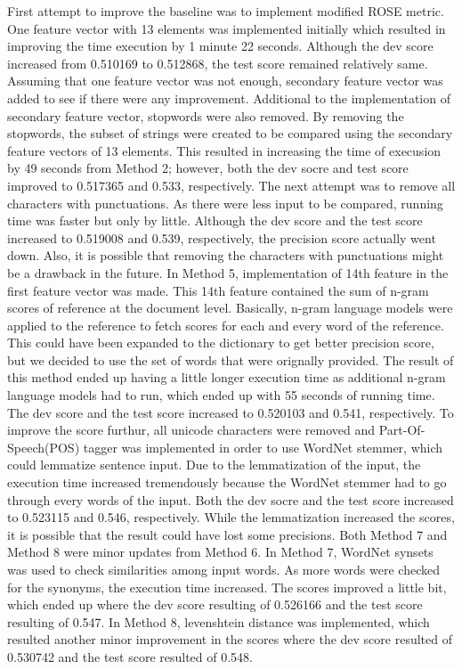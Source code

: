 \documentclass[11pt,letterpaper]{article}
\begin{document}
First attempt to improve the baseline was to implement modified ROSE metric. One feature vector with 13 elements was implemented initially which resulted in improving the time execution by 1 minute 22 seconds. Although the dev score increased from 0.510169 to 0.512868, the test score remained relatively same. Assuming that one feature vector was not enough, secondary feature vector was added to see if there were any improvement.
        Additional to the implementation of secondary feature vector, stopwords were also removed. By removing the stopwords, the subset of strings were created to be compared using the secondary feature vectors of 13 elements. This resulted in increasing the time of execusion by 49 seconds from Method 2; however, both the dev socre and test score improved to 0.517365 and 0.533, respectively.
        The next attempt was to remove all characters with punctuations. As there were less input to be compared, running time was faster but only by little. Although the dev score and the test score increased to 0.519008 and 0.539, respectively, the precision score actually went down. Also, it is possible that removing the characters with punctuations might be a drawback in the future.
        In Method 5, implementation of 14th feature in the first feature vector was made. This 14th feature contained the sum of n-gram scores of reference at the document level. Basically, n-gram language models were applied to the reference to fetch scores for each and every word of the reference. This could have been expanded to the dictionary to get better precision score, but we decided to use the set of words that were orignally provided. The result of this method ended up having a little longer execution time as additional n-gram language models had to run, which ended up with 55 seconds of running time. The dev score and the test score increased to 0.520103 and 0.541, respectively.
        To improve the score furthur, all unicode characters were removed and Part-Of-Speech(POS) tagger was implemented in order to use WordNet stemmer, which could lemmatize sentence input. Due to the lemmatization of the input, the execution time increased tremendously because the WordNet stemmer had to go through every words of the input. Both the dev socre and the test score increased to 0.523115 and 0.546, respectively. While the lemmatization increased the scores, it is possible that the result could have lost some precisions.
        Both Method 7 and Method 8 were minor updates from Method 6. In Method 7, WordNet synsets was used to check similarities among input words. As more words were checked for the synonyms, the execution time increased. The scores improved a little bit, which ended up where the dev score resulting of 0.526166 and the test score resulting of 0.547. In Method 8, levenshtein distance was implemented, which resulted another minor improvement in the scores where the dev score resulted of 0.530742 and the test score resulted of 0.548.
\end{document}
